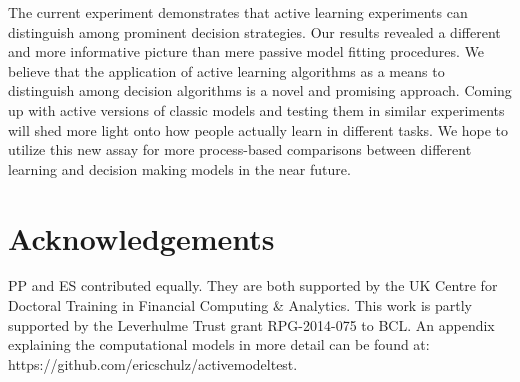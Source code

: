 \documentclass[10pt,letterpaper]{article}
\begin{document}
The current experiment demonstrates that active learning experiments can distinguish among prominent decision strategies. Our results revealed a different and more informative picture than mere passive model fitting procedures. We believe that the application of active learning algorithms as a means to distinguish among decision algorithms is a novel and promising approach. Coming up with active versions of classic models and testing them in similar experiments will shed more light onto how people actually learn in different tasks. We hope to utilize this new assay for more process-based comparisons between different learning and decision making models in the near future.
\section{Acknowledgements}
PP and ES contributed equally. They are both supported by the UK Centre for Doctoral Training in Financial Computing \& Analytics.  This work is partly supported by the Leverhulme Trust grant RPG-2014-075 to BCL. An appendix explaining the computational models in more detail can be found at: https://github.com/ericschulz/activemodeltest.
\footnotesize


\end{document}
